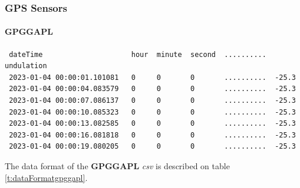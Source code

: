 \documentclass[12pt]{article}
\begin{document}
\subsubsection{GPS Sensors}
\paragraph{GPGGAPL}
    \label{sec:gpggaplDataFormat}
{  
\begin{verbatim}
 dateTime                     hour  minute  second  ..........  undulation
 2023-01-04 00:00:01.101081   0     0       0       ..........  -25.3
 2023-01-04 00:00:04.083579   0     0       0       ..........  -25.3
 2023-01-04 00:00:07.086137   0     0       0       ..........  -25.3
 2023-01-04 00:00:10.085323   0     0       0       ..........  -25.3
 2023-01-04 00:00:13.082585   0     0       0       ..........  -25.3
 2023-01-04 00:00:16.081818   0     0       0       ..........  -25.3
 2023-01-04 00:00:19.080205   0     0       0       ..........  -25.3
\end{verbatim} } 
         The data format of the \textbf{GPGGAPL} \emph{csv} is described on table \ref{t:dataFormatgpggapl}.
        
\end{document}
